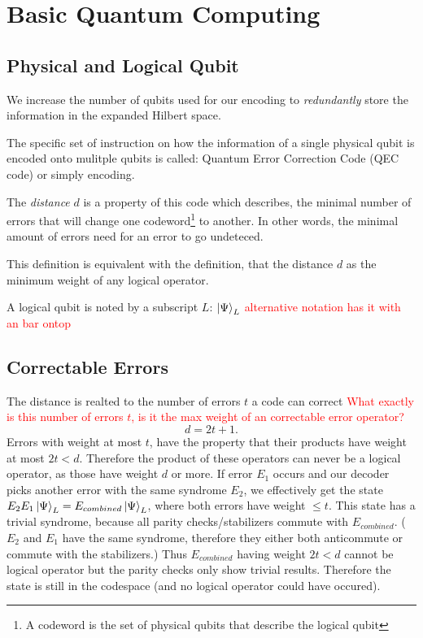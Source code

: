 \section{Basic Quantum Computing}

\subsection{Physical and Logical Qubit}

We increase the number of qubits used for our encoding to \textit{redundantly} store the information in the expanded Hilbert space. \cite{QECintro}

The specific set of instruction on how the information of a single physical 
qubit is encoded onto mulitple qubits is called:
Quantum Error Correction Code (QEC code) or simply encoding. \cite{QECintro}

The \textit{distance} $d$ is a property of this code which describes, 
the minimal number of errors that will change one 
codeword\footnote{A codeword is the set of physical qubits that describe the logical qubit} to another.
In other words, the minimal amount of errors need for an error to go undeteced. \cite{QECintro}

This definition is equivalent with the definition, that the distance $d$ as the minimum weight of any logical operator. \cite{QECmemory}

A logical qubit is noted by a subscript $L$: $\ket{\Psi}_L$
\textcolor{red}{alternative notation has it with an bar ontop}


\subsection{Correctable Errors}
The distance is realted to the number of errors $t$ a code can correct \cite{QECintro}
\textcolor{red}{What exactly is this number of errors $t$, is it the max weight of an correctable error operator?}
\begin{equation}
    d = 2t+1.
\end{equation}
Errors with weight at most $t$, have the property that their products have weight at most $2t<d$.
Therefore the product of these operators can never be a logical operator, as those have weight $d$ or more. 
If error $E_1$ occurs and our decoder picks another error with the same syndrome $E_2$, 
we effectively get the state $E_2 E_1 \ket{\Psi}_L = E_{combined} \ket{\Psi}_L$, where both errors have weight $\leq t$.
This state has a trivial syndrome, because all parity checks/stabilizers commute with $E_{combined}$.
($E_2$ and $E_1$ have the same syndrome, therefore they either both anticommute or commute with the stabilizers.) 
Thus $E_{combined}$ having weight $2t<d$ cannot be logical operator but the parity checks only show trivial results. \cite{QECmemory}
Therefore the state is still in the codespace (and no logical operator could have occured).

